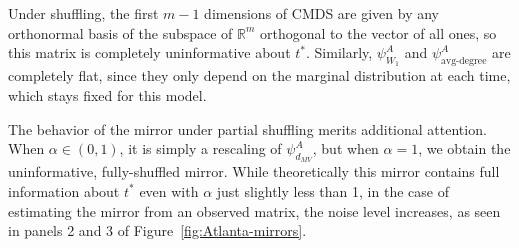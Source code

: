 \documentclass[12pt]{article}
\newcommand{\RR}{\mathbb{R}}
\theoremstyle{definition}
\begin{document}
Under shuffling, the first $m-1$ dimensions of CMDS are given by any orthonormal basis of the subspace of $\RR^{m}$ orthogonal to the vector of all ones, so this matrix is completely uninformative about $t^*$. Similarly, $\psi^A_{W_1}$ and $\psi^A_{\text{avg-degree}}$ are completely flat, since they only depend on the marginal distribution at each time, which stays fixed for this model. 

The behavior of the mirror under partial shuffling merits additional attention. When $\alpha\in(0,1)$, it is simply a rescaling of $\psi_{d_{MV}}^A$, but when $\alpha=1$, we obtain the uninformative, fully-shuffled mirror. While theoretically this mirror contains full information about $t^*$ even with $\alpha$ just slightly less than 1, in the case of estimating the mirror from an observed matrix, the noise level increases, as seen in panels 2 and 3 of Figure~\ref{fig:Atlanta-mirrors}.

\end{document}
